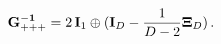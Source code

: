 \begin{equation}
\label{invmetricD} {\bf G^{-1}_{ +++}}= 2\, {\bf I}_1 \oplus ({\bf I}_D -
\frac{1}{D-2}{\bf\Xi}_D)\, .
\end{equation}

